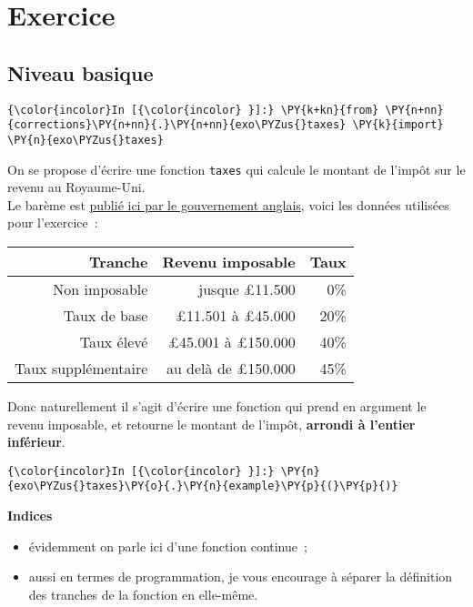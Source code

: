     \hypertarget{exercice}{%
\section{Exercice}\label{exercice}}

    \hypertarget{niveau-basique}{%
\subsection{Niveau basique}\label{niveau-basique}}

    \begin{Verbatim}[commandchars=\\\{\}]
{\color{incolor}In [{\color{incolor} }]:} \PY{k+kn}{from} \PY{n+nn}{corrections}\PY{n+nn}{.}\PY{n+nn}{exo\PYZus{}taxes} \PY{k}{import} \PY{n}{exo\PYZus{}taxes}
\end{Verbatim}


    On se propose d'écrire une fonction \texttt{taxes} qui calcule le
montant de l'impôt sur le revenu au Royaume-Uni.\\

    Le barème est \href{https://www.gov.uk/income-tax-rates}{publié ici par
le gouvernement anglais}, voici les données utilisées pour l'exercice~:

    \begin{longtable}[]{@{}rrr@{}}
\toprule
Tranche & Revenu imposable & Taux\tabularnewline
\midrule
\endhead
Non imposable & jusque £11.500 & 0\%\tabularnewline
Taux de base & £11.501 à £45.000 & 20\%\tabularnewline
Taux élevé & £45.001 à £150.000 & 40\%\tabularnewline
Taux supplémentaire & au delà de £150.000 & 45\%\tabularnewline
\bottomrule
\end{longtable}

    Donc naturellement il s'agit d'écrire une fonction qui prend en argument
le revenu imposable, et retourne le montant de l'impôt, \textbf{arrondi
à l'entier inférieur}.

    \begin{Verbatim}[commandchars=\\\{\}]
{\color{incolor}In [{\color{incolor} }]:} \PY{n}{exo\PYZus{}taxes}\PY{o}{.}\PY{n}{example}\PY{p}{(}\PY{p}{)}
\end{Verbatim}


    \textbf{Indices}

\begin{itemize}
\tightlist
\item
  évidemment on parle ici d'une fonction continue~;
\item
  aussi en termes de programmation, je vous encourage à séparer la
  définition des tranches de la fonction en elle-même.
\end{itemize}

